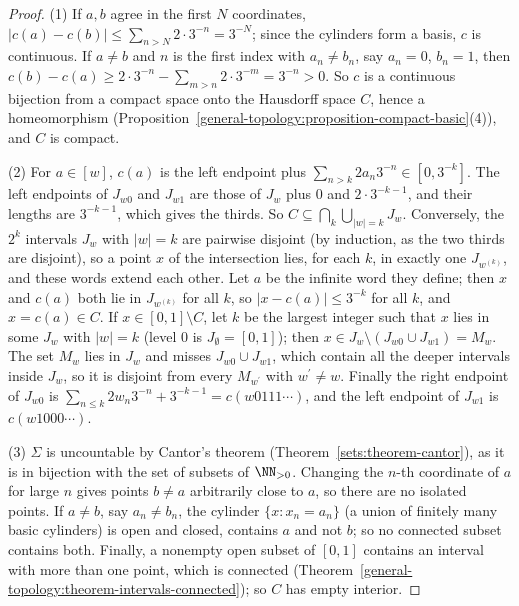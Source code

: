 \begin{proof}
(1) If $a, b$ agree in the first $N$ coordinates, $|c(a) - c(b)| \leq \sum_{n > N}2 \cdot 3^{-n} = 3^{-N}$; since the cylinders form a basis, $c$ is continuous. If $a \neq b$ and $n$ is the first index with
$a_n \neq b_n$, say $a_n = 0$, $b_n = 1$, then $c(b) - c(a) \geq 2 \cdot 3^{-n} - \sum_{m > n}2 \cdot 3^{-m} = 3^{-n} > 0$. So $c$ is a continuous bijection from a compact space onto the Hausdorff space $C$, hence
a homeomorphism (Proposition~\ref{general-topology:proposition-compact-basic}(4)), and $C$ is compact.

(2) For $a \in [w]$, $c(a)$ is the left endpoint plus $\sum_{n > k}2a_n3^{-n} \in [0, 3^{-k}]$. The left endpoints of $J_{w0}$ and $J_{w1}$ are those of $J_w$ plus $0$ and $2 \cdot 3^{-k-1}$, and their lengths are
$3^{-k-1}$, which gives the thirds. So $C \subseteq \bigcap_k\bigcup_{|w| = k}J_w$. Conversely, the $2^k$ intervals $J_w$ with $|w| = k$ are pairwise disjoint (by induction, as the two thirds are disjoint), so a
point $x$ of the intersection lies, for each $k$, in exactly one $J_{w^{(k)}}$, and these words extend each other. Let $a$ be the infinite word they define; then $x$ and $c(a)$ both lie in $J_{w^{(k)}}$ for all $k$,
so $|x - c(a)| \leq 3^{-k}$ for all $k$, and $x = c(a) \in C$. If $x \in [0, 1] \setminus C$, let $k$ be the largest integer such that $x$ lies in some $J_w$ with $|w| = k$ (level $0$ is
$J_\emptyset = [0, 1]$); then $x \in J_w \setminus (J_{w0} \cup J_{w1}) = M_w$. The set $M_w$ lies in $J_w$ and misses $J_{w0} \cup J_{w1}$, which contain all the deeper intervals inside $J_w$, so it is
disjoint from every $M_{w^{\prime}}$ with $w^{\prime} \neq w$. Finally the right endpoint of $J_{w0}$ is $\sum_{n \leq k}2w_n3^{-n} + 3^{-k-1} = c(w0111\cdots)$, and the left endpoint of $J_{w1}$ is $c(w1000\cdots)$.

(3) $\Sigma$ is uncountable by Cantor's theorem (Theorem~\ref{sets:theorem-cantor}), as it is in bijection with the set of subsets of $\NN_{>0}$. Changing the $n$-th coordinate of $a$ for large $n$ gives points
$b \neq a$ arbitrarily close to $a$, so there are no isolated points. If $a \neq b$, say $a_n \neq b_n$, the cylinder $\{x : x_n = a_n\}$ (a union of finitely many basic cylinders) is open and closed, contains $a$
and not $b$; so no connected subset contains both. Finally, a nonempty open subset of $[0, 1]$ contains an interval with more than one point, which is connected
(Theorem~\ref{general-topology:theorem-intervals-connected}); so $C$ has empty interior.
\end{proof}


